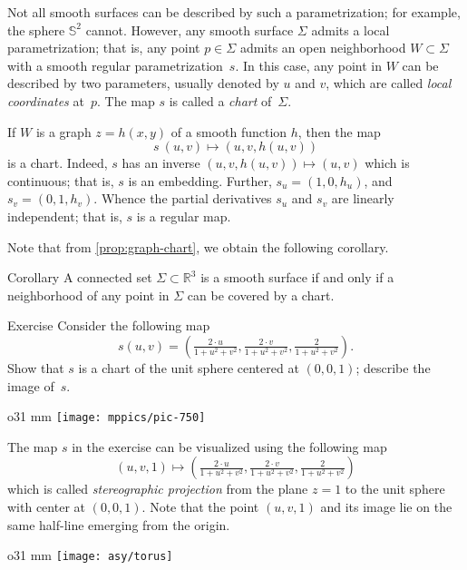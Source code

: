 Not all smooth surfaces can be described by such a parametrization;
for example, the sphere $\mathbb{S}^2$ cannot.
However, any smooth surface $\Sigma$ admits a local parametrization; that is, any point $p\in\Sigma$ admits an open neighborhood $W\subset \Sigma$ with a smooth regular parametrization~$s$.
In this case, any point in $W$ can be described by two parameters, usually denoted by $u$ and $v$, 
which are called \emph{local coordinates} at~$p$.
The map $s$ is called a \emph{chart} of~$\Sigma$.

If $W$ is a graph $z=h(x,y)$ of a smooth function $h$, then the map 
\[s\:(u,v)\mapsto (u,v,h(u,v))\] is a chart.
Indeed, $s$ has an inverse $(u,v,h(u,v))\mapsto (u,v)$ which is continuous;
that is, $s$ is an embedding.
Further,
$s_u=(1,0,h_u)$, and $s_v=(0,1,h_v)$. 
Whence the partial derivatives $s_u$ and $s_v$ are linearly independent;
that is, $s$ is a regular map.

Note that from \ref{prop:graph-chart}, we obtain the following corollary.

\begin{thm}{Corollary}\label{cor:reg-parmeterization}
A connected set $\Sigma\subset \mathbb{R}^3$ is a smooth surface if and only if a neighborhood of any point in $\Sigma$ can be covered by a chart.
\end{thm}


\begin{thm}{Exercise}\label{ex:inversion-chart}
Consider the following map 
\[s(u,v)=(\tfrac{2\cdot u}{1+u^2+v^2},\tfrac{2\cdot v}{1+u^2+v^2},\tfrac{2}{1+u^2+v^2}).\]
Show that $s$ is a chart of the unit sphere centered at $(0,0,1)$; describe the image of~$s$.
\end{thm}

\begin{wrapfigure}{o}{31 mm}
\vskip-6mm
\centering
\texttt{[image: mppics/pic-750]}
\vskip0mm
\end{wrapfigure}

The map $s$ in the exercise can be visualized using the following map
\[(u,v,1)\mapsto (\tfrac{2\cdot u}{1+u^2+v^2},\tfrac{2\cdot v}{1+u^2+v^2},\tfrac{2}{1+u^2+v^2})\]
which is called \emph{stereographic projection} from the plane $z=1$ to the unit sphere with center at $(0,0,1)$.
Note that the point $(u,v,1)$ and its image lie on the same half-line emerging from the origin. 

\begin{wrapfigure}{o}{31 mm}
\vskip0mm
\centering
\texttt{[image: asy/torus]}
\vskip0mm
\end{wrapfigure}

